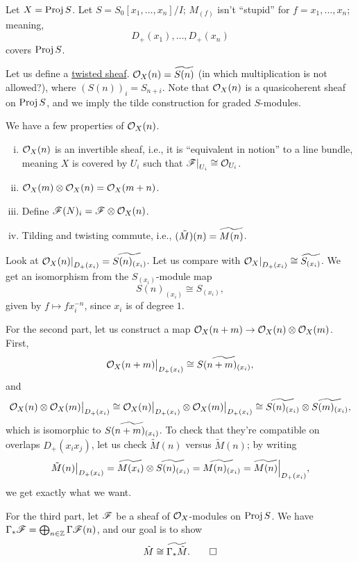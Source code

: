 Let $X = \operatorname{Proj} S$. Let $S = S_0[x_1, \dots, x_n]/I$; $M_{(f)}$ isn't ``stupid'' for $f = x_1, \dots, x_n$; meaning,
\[ D_+(x_1), \dots, D_+(x_n) \]
covers $\operatorname{Proj} S$.

Let us define a \href{https://stacks.math.columbia.edu/tag/01MM}{twisted sheaf}. $\mathcal O_X(n) = \widetilde{S(n)}$ (in which multiplication is not allowed?), where $(S(n))_i = S_{n+i}$. Note that $\mathcal O_X(n)$ is a quasicoherent sheaf on $\operatorname{Proj} S$, and we imply the tilde construction for graded $S$-modules.

\newpage
\begin{theorem} \label{thm:twisted_sheaf_invertible}
    We have a few properties of $\mathcal O_X(n)$.
    \begin{enumerate}[(i)]
        \item $\mathcal O_X(n)$ is an invertible sheaf, i.e., it is ``equivalent in notion'' to a line bundle, meaning $X$ is covered by $U_i$ such that $\restr{\SCF}{U_i} \cong \SO_{U_i}$.
        \item $\mathcal O_X(m) \otimes \mathcal O_X(n) = \mathcal O_X(m+n)$.
        \item Define $\mathscr F(N)_i = \mathscr F \otimes \mathcal O_X(n)$.
        \item Tilding and twisting commute, i.e., $(\tilde M)(n) = \widetilde{M(n)}$.
    \end{enumerate}
\end{theorem}
\begin{semiproof}
    Look at $\restr{\SO_X(n)}{D_+(x_i)} = \wt{S(n)_{(x_i)}}$. Let us compare with $\restr{\SO_X}{D_+(x_i)} \cong \wt{S_{(x_i)}}$. We get an isomorphism from the $S_{(x_i)}$-module map
    \[ S(n)_{(x_i)} \cong S_{(x_i)}, \]
    given by $f \mapsto f x_i^{-n}$, since $x_i$ is of degree $1$.

    For the second part, let us construct a map $\mathcal O_X(n+m) \to \mathcal O_X(n) \otimes \mathcal O_X(m)$. First,
    \[ \restr{\SO_X(n+m)}{D_+(x_i)} \cong \wt{S(n+m)_{(x_i)}}, \]
    and
    \[  \restr{\SO_X(n) \otimes \SO_X(m)}{D_+(x_i)} \cong \restr{\SO_X(n)}{D_+(x_i)} \otimes \restr{\SO_X(m)}{D_+(x_i)} \cong \wt{S(n)_{(x_i)}} \otimes \wt{S(m)_{(x_i)}}, \]
    which is isomorphic to $\widetilde{S(n+m)_{(x_i)}}$. To check that they're compatible on overlaps $D_+(x_i x_j)$, let us check $\tilde M(n)$ versus $\tilde M(n)$; by writing
    \[ \restr{\tilde M(n)}{D_+(x_i)} = \wt{M(x_i)} \otimes \wt{S(n)_{(x_i)}} = \wt{M(n)_{(x_i)}} = \restr{\wt{M(n)}}{D_+(x_i)}, \]
    we get exactly what we want.

    For the third part, let $\mathscr F$ be a sheaf of $\mathcal O_X$-modules on $\operatorname{Proj} S$. We have $\Gamma_\ast \mathscr F = \bigoplus_{n \in \mathbb Z} \Gamma \mathscr F(n)$, and our goal is to show
    \[ \tilde M \cong \widetilde{\Gamma_\ast \tilde M}. \qedhere \]
\end{semiproof}
